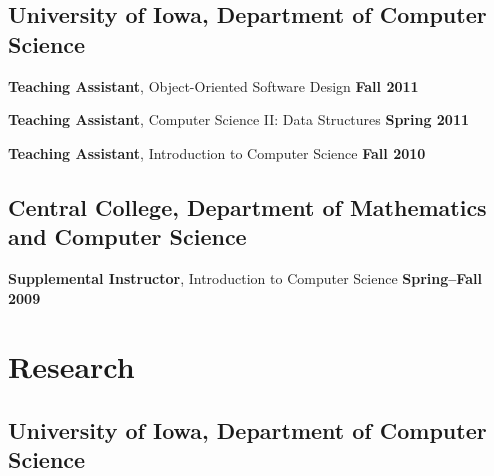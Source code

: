 \documentclass[10pt,letterpaper]{article}
\renewenvironment{itemize}{
  \begin{list}{}{
      \setlength{\leftmargin}{1.5em}
      \setlength{\itemsep}{0.25em}
      \setlength{\parskip}{0pt}
      \setlength{\parsep}{0.25em}
    }
  }{
  \end{list}
}
\newcommand{\yearrange}[1]{\hfill \textbf{#1} \par}
\begin{document}
\subsection*{University of Iowa, Department of Computer Science}

\begin{itemize}
\item \textbf{Teaching Assistant}, Object-Oriented Software Design \yearrange{Fall 2011}
\item \textbf{Teaching Assistant}, Computer Science II: Data Structures \yearrange{Spring 2011}
\item \textbf{Teaching Assistant}, Introduction to Computer Science \yearrange{Fall 2010}
\end{itemize}

\subsection*{Central College, Department of Mathematics and
  Computer Science}

\begin{itemize}
\item \textbf{Supplemental Instructor}, Introduction to Computer
  Science \yearrange{Spring--Fall 2009}
\end{itemize}

\pagebreak

\section*{Research}

\subsection*{University of Iowa, Department of Computer Science}
\end{document}
